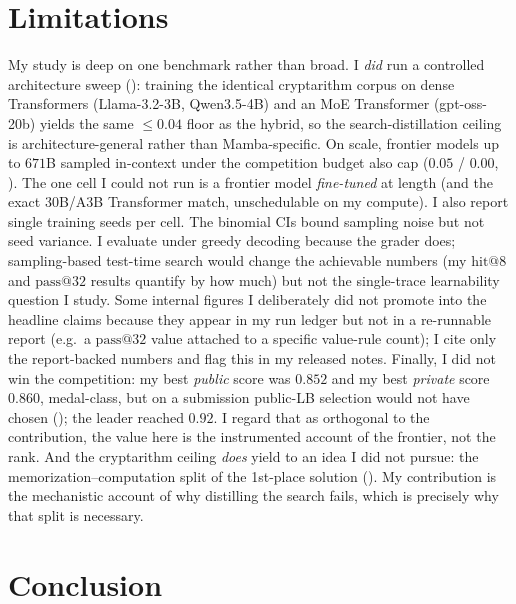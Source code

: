 \documentclass[11pt]{article}
\begin{document}
\section{Limitations}
\label{sec:limitations}

My study is deep on one benchmark rather than broad. I \emph{did} run a controlled
architecture sweep (): training the identical cryptarithm corpus on dense
Transformers (Llama-3.2-3B, Qwen3.5-4B) and an MoE Transformer (gpt-oss-20b) yields the same
$\leq\!0.04$ floor as the hybrid, so the search-distillation ceiling is architecture-general
rather than Mamba-specific.
On scale, frontier models up to $671$B sampled in-context under the competition budget also cap
($0.05$ / $0.00$, ). The one cell I could not run is a frontier model
\emph{fine-tuned} at length (and the exact 30B/A3B Transformer match, unschedulable on my
compute). I also report single training seeds per cell. The binomial CIs bound sampling noise
but not seed variance. I evaluate under greedy decoding because the grader does; sampling-based test-time
search would change the achievable numbers (my $\mathrm{hit@}8$ and $\mathrm{pass@}32$
results quantify by how much) but not the single-trace learnability question I study. Some
internal figures I deliberately did not promote into the headline claims because they
appear in my run ledger but not in a re-runnable report (e.g.\ a $\mathrm{pass@}32$ value
attached to a specific value-rule count); I cite only the report-backed numbers and flag
this in my released notes. Finally, I did not win the competition: my best \emph{public}
score was $0.852$ and my best \emph{private} score $0.860$, medal-class, but on a submission
public-LB selection would not have chosen (); the leader reached $0.92$.
I regard that as orthogonal to the contribution, the value here is the instrumented
account of the frontier, not the rank. And the cryptarithm ceiling \emph{does} yield to an idea I
did not pursue: the memorization--computation split of the 1st-place solution ().
My contribution is the mechanistic account of why distilling the search fails, which is precisely
why that split is necessary.

\section{Conclusion}
\label{sec:conclusion}
\end{document}

